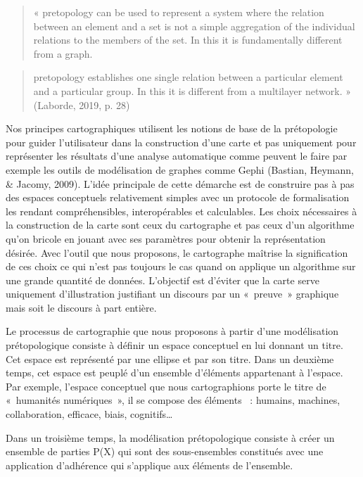 \documentclass[
  a4paper,
  DIV=11,
  numbers=noendperiod]{scrreprt}
\begin{document}
\begin{quote}
« pretopology can be used to represent a system where the relation
between an element and a set is not a simple aggregation of the
individual relations to the members of the set. In this it is
fundamentally different from a graph.
\end{quote}

\begin{quote}
pretopology establishes one single relation between a particular element
and a particular group. In this it is different from a multilayer
network. » (Laborde, 2019, p. 28)
\end{quote}

Nos principes cartographiques utilisent les notions de base de la
prétopologie pour guider l'utilisateur dans la construction d'une carte
et pas uniquement pour représenter les résultats d'une analyse
automatique comme peuvent le faire par exemple les outils de
modélisation de graphes comme Gephi (Bastian, Heymann, \& Jacomy, 2009).
L'idée principale de cette démarche est de construire pas à pas des
espaces conceptuels relativement simples avec un protocole de
formalisation les rendant compréhensibles, interopérables et
calculables. Les choix nécessaires à la construction de la carte sont
ceux du cartographe et pas ceux d'un algorithme qu'on bricole en jouant
avec ses paramètres pour obtenir la représentation désirée. Avec l'outil
que nous proposons, le cartographe maîtrise la signification de ces
choix ce qui n'est pas toujours le cas quand on applique un algorithme
sur une grande quantité de données. L'objectif est d'éviter que la carte
serve uniquement d'illustration justifiant un discours par un «~preuve~»
graphique mais soit le discours à part entière.

Le processus de cartographie que nous proposons à partir d'une
modélisation prétopologique consiste à définir un espace conceptuel en
lui donnant un titre. Cet espace est représenté par une ellipse et par
son titre. Dans un deuxième temps, cet espace est peuplé d'un ensemble
d'éléments appartenant à l'espace. Par exemple, l'espace conceptuel que
nous cartographions porte le titre de «~humanités numériques~», il se
compose des éléments ~: humains, machines, collaboration, efficace,
biais, cognitifs\ldots{}

Dans un troisième temps, la modélisation prétopologique consiste à créer
un ensemble de parties P(X) qui sont des sous-ensembles constitués avec
une application d'adhérence qui s'applique aux éléments de l'ensemble.
\end{document}
